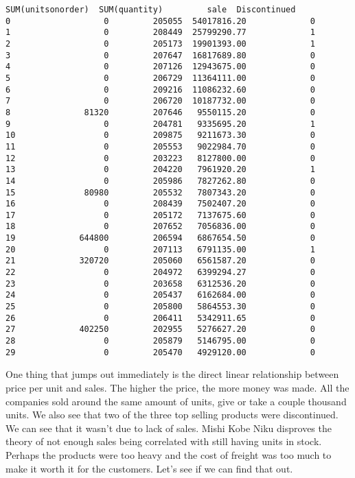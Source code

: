 \documentclass[11pt]{article}
\begin{document}
\begin{tcolorbox}[breakable, size=fbox, boxrule=.5pt, pad at break*=1mm, opacityfill=0]
\begin{Verbatim}[commandchars=\\\{\}]
    SUM(unitsonorder)  SUM(quantity)         sale  Discontinued
0                   0         205055  54017816.20             0
1                   0         208449  25799290.77             1
2                   0         205173  19901393.00             1
3                   0         207647  16817689.80             0
4                   0         207126  12943675.00             0
5                   0         206729  11364111.00             0
6                   0         209216  11086232.60             0
7                   0         206720  10187732.00             0
8               81320         207646   9550115.20             0
9                   0         204781   9335695.20             1
10                  0         209875   9211673.30             0
11                  0         205553   9022984.70             0
12                  0         203223   8127800.00             0
13                  0         204220   7961920.20             1
14                  0         205986   7827262.80             0
15              80980         205532   7807343.20             0
16                  0         208439   7502407.20             0
17                  0         205172   7137675.60             0
18                  0         207652   7056836.00             0
19             644800         206594   6867654.50             0
20                  0         207113   6791135.00             1
21             320720         205060   6561587.20             0
22                  0         204972   6399294.27             0
23                  0         203658   6312536.20             0
24                  0         205437   6162684.00             0
25                  0         205800   5864553.30             0
26                  0         206411   5342911.65             0
27             402250         202955   5276627.20             0
28                  0         205879   5146795.00             0
29                  0         205470   4929120.00             0
\end{Verbatim}
\end{tcolorbox}
        
    One thing that jumps out immediately is the direct linear relationship
between price per unit and sales. The higher the price, the more money
was made. All the companies sold around the same amount of units, give
or take a couple thousand units. We also see that two of the three top
selling products were discontinued. We can see that it wasn't due to
lack of sales. Mishi Kobe Niku disproves the theory of not enough sales
being correlated with still having units in stock. Perhaps the products
were too heavy and the cost of freight was too much to make it worth it
for the customers. Let's see if we can find that out.
\end{document}
